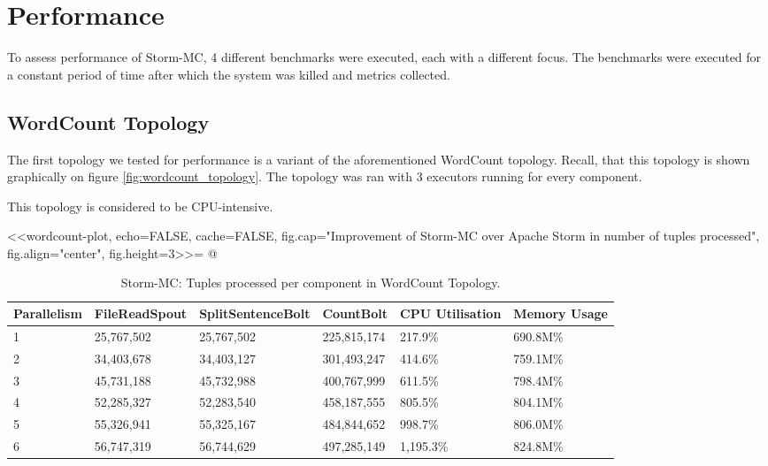 
\section{Performance}
\label{sec:performance}


To assess performance of Storm-MC, 4 different benchmarks were executed, each with a different focus. The benchmarks were executed for a constant period of time after which the system was killed and metrics collected.

\subsection{WordCount Topology}

The first topology we tested for performance is a variant of the aforementioned WordCount topology. Recall, that this topology is shown graphically on figure \ref{fig:wordcount_topology}. The topology was ran with 3 executors running for every component.

This topology is considered to be CPU-intensive.

<<wordcount-plot, echo=FALSE, cache=FALSE, fig.cap="Improvement of Storm-MC over Apache Storm in number of tuples processed", fig.align="center", fig.height=3>>=
@

\medskip
\begin{table}[!htb]
\begin{adjustwidth}{-0.5in}{-0.5in}
\centering
\small
\begin{tabular}{@{}llllll@{}}
    {Parallelism} & {FileReadSpout} & {SplitSentenceBolt} & {CountBolt} & {CPU Utilisation} & {Memory Usage} \\ \toprule
    1 & {25,767,502} & {25,767,502} & {225,815,174} & {217.9\%} & {690.8M\%} \\
    2 & {34,403,678} & {34,403,127} & {301,493,247} & {414.6\%} & {759.1M\%} \\
    3 & {45,731,188} & {45,732,988} & {400,767,999} & {611.5\%} & {798.4M\%} \\
    4 & {52,285,327} & {52,283,540} & {458,187,555} & {805.5\%} & {804.1M\%} \\
	5 & {55,326,941} & {55,325,167} & {484,844,652} & {998.7\%} & {806.0M\%} \\
	6 & {56,747,319} & {56,744,629} & {497,285,149} & {1,195.3\%} & {824.8M\%} \\
\end{tabular}
\caption{Storm-MC: Tuples processed per component in WordCount Topology.}
\end{adjustwidth}
\label{table:storm_mcwordcount}
\end{table}
\medskip

